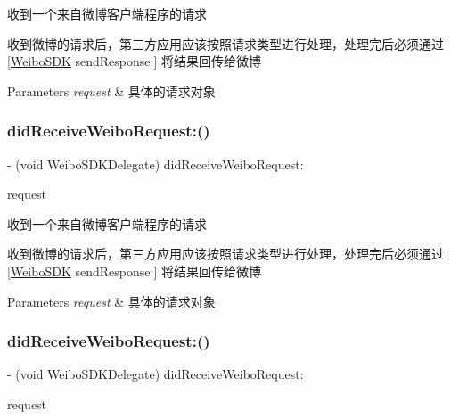 收到一个来自微博客户端程序的请求

收到微博的请求后，第三方应用应该按照请求类型进行处理，处理完后必须通过 \mbox{[}\mbox{\hyperlink{interface_weibo_s_d_k}{Weibo\+S\+DK}} send\+Response\+:\mbox{]} 将结果回传给微博 
\begin{DoxyParams}{Parameters}
{\em request} & 具体的请求对象 \\
\hline
\end{DoxyParams}
\mbox{\label{protocol_weibo_s_d_k_delegate_01-p_ab90ef15bbc631a63f2b805b8bab5089e}} 
\subsubsection{\texorpdfstring{did\+Receive\+Weibo\+Request\+:()}{didReceiveWeiboRequest:()}\hspace{0.1cm}{\footnotesize\ttfamily [2/3]}}
{\footnotesize\ttfamily -\/ (void Weibo\+S\+D\+K\+Delegate) did\+Receive\+Weibo\+Request\+: \begin{DoxyParamCaption}\item[{(\mbox{\hyperlink{interface_w_b_base_request}{W\+B\+Base\+Request}} $\ast$)}]{request }\end{DoxyParamCaption}}

收到一个来自微博客户端程序的请求

收到微博的请求后，第三方应用应该按照请求类型进行处理，处理完后必须通过 \mbox{[}\mbox{\hyperlink{interface_weibo_s_d_k}{Weibo\+S\+DK}} send\+Response\+:\mbox{]} 将结果回传给微博 
\begin{DoxyParams}{Parameters}
{\em request} & 具体的请求对象 \\
\hline
\end{DoxyParams}
\mbox{\label{protocol_weibo_s_d_k_delegate_01-p_ab90ef15bbc631a63f2b805b8bab5089e}} 
\subsubsection{\texorpdfstring{did\+Receive\+Weibo\+Request\+:()}{didReceiveWeiboRequest:()}\hspace{0.1cm}{\footnotesize\ttfamily [3/3]}}
{\footnotesize\ttfamily -\/ (void Weibo\+S\+D\+K\+Delegate) did\+Receive\+Weibo\+Request\+: \begin{DoxyParamCaption}\item[{(\mbox{\hyperlink{interface_w_b_base_request}{W\+B\+Base\+Request}} $\ast$)}]{request }\end{DoxyParamCaption}}

